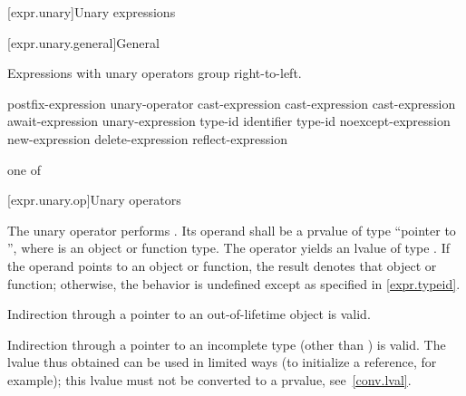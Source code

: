 [expr.unary]{Unary expressions}

[expr.unary.general]{General}

\pnum
{}%
Expressions with unary operators group right-to-left.

%
%
%
%
%
\begin{bnf}
\br
    postfix-expression\br
    unary-operator cast-expression\br
    \terminal{++} cast-expression\br
    \terminal{--} cast-expression\br
    await-expression\br
     unary-expression\br
     \terminal{(} type-id \terminal{)}\br
      \terminal{(} identifier \terminal{)}\br
     \terminal{(} type-id \terminal{)}\br
    noexcept-expression\br
    new-expression\br
    delete-expression\br
    reflect-expression
\end{bnf}

%
%
%
%
%
%
%
%
%
%
%
%
%
%
%
\begin{bnf}
 \textnormal{one of}\br
    \terminal{*  \&  +  -  !  \~}
\end{bnf}

[expr.unary.op]{Unary operators}

\pnum
{}%
%
The unary \tcode{*} operator performs .
%
Its operand shall be a prvalue of type ``pointer to '',
where  is an object or function type.
The operator yields an lvalue of type .
If the operand points to an object or function,
the result denotes that object or function;
otherwise, the behavior is undefined except as specified in \ref{expr.typeid}.
\begin{note}
Indirection through a pointer to an out-of-lifetime object is valid.
\end{note}
\begin{note}
%
Indirection through a pointer to an incomplete type (other than
\cv{} ) is valid. The lvalue thus obtained can be
used in limited ways (to initialize a reference, for example); this
lvalue must not be converted to a prvalue, see~\ref{conv.lval}.
\end{note}

